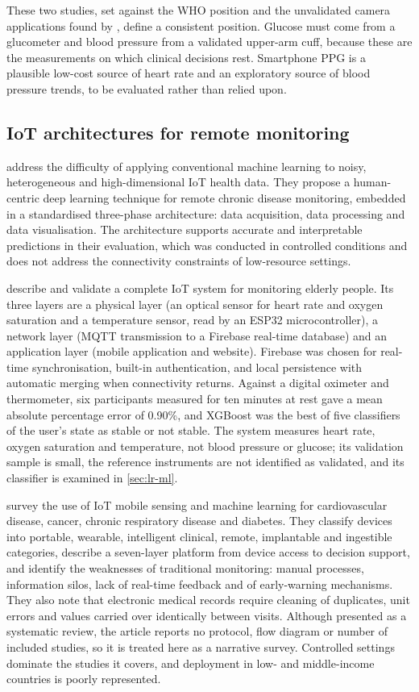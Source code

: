 \documentclass[11pt,a4paper,oneside]{report}
\begin{document}
These two studies, set against the WHO position and the unvalidated camera applications found by \textcite{alessa2019}, define a consistent position. Glucose must come from a glucometer and blood pressure from a validated upper-arm cuff, because these are the measurements on which clinical decisions rest. Smartphone PPG is a plausible low-cost source of heart rate and an exploratory source of blood pressure trends, to be evaluated rather than relied upon.

\subsection{IoT architectures for remote monitoring}

\Textcite{tai2024} address the difficulty of applying conventional machine learning to noisy, heterogeneous and high-dimensional IoT health data. They propose a human-centric deep learning technique for remote chronic disease monitoring, embedded in a standardised three-phase architecture: data acquisition, data processing and data visualisation. The architecture supports accurate and interpretable predictions in their evaluation, which was conducted in controlled conditions and does not address the connectivity constraints of low-resource settings.

\Textcite{efendi2025} describe and validate a complete IoT system for monitoring elderly people. Its three layers are a physical layer (an optical sensor for heart rate and oxygen saturation and a temperature sensor, read by an ESP32 microcontroller), a network layer (MQTT transmission to a Firebase real-time database) and an application layer (mobile application and website). Firebase was chosen for real-time synchronisation, built-in authentication, and local persistence with automatic merging when connectivity returns. Against a digital oximeter and thermometer, six participants measured for ten minutes at rest gave a mean absolute percentage error of 0.90\%, and XGBoost was the best of five classifiers of the user's state as stable or not stable. The system measures heart rate, oxygen saturation and temperature, not blood pressure or glucose; its validation sample is small, the reference instruments are not identified as validated, and its classifier is examined in \cref{sec:lr-ml}.

\Textcite{liu2025review} survey the use of IoT mobile sensing and machine learning for cardiovascular disease, cancer, chronic respiratory disease and diabetes. They classify devices into portable, wearable, intelligent clinical, remote, implantable and ingestible categories, describe a seven-layer platform from device access to decision support, and identify the weaknesses of traditional monitoring: manual processes, information silos, lack of real-time feedback and of early-warning mechanisms. They also note that electronic medical records require cleaning of duplicates, unit errors and values carried over identically between visits. Although presented as a systematic review, the article reports no protocol, flow diagram or number of included studies, so it is treated here as a narrative survey. Controlled settings dominate the studies it covers, and deployment in low- and middle-income countries is poorly represented.
\end{document}
